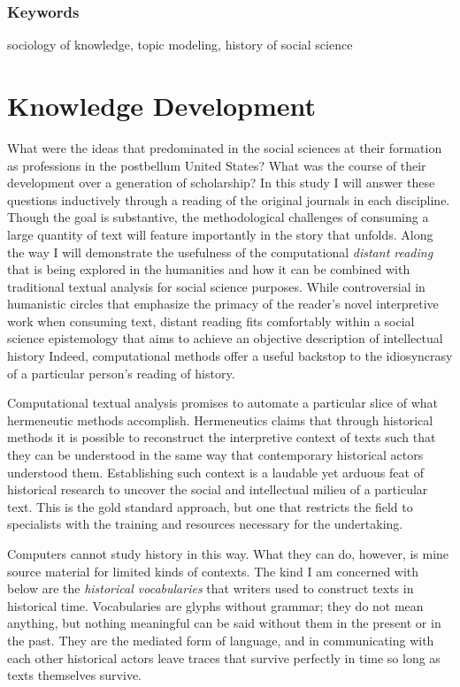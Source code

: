 \documentclass[]{book}
\theoremstyle{definition}
\theoremstyle{definition}
\theoremstyle{definition}
\theoremstyle{remark}
\begin{document}
\hypertarget{keywords-3}{%
\subsubsection*{Keywords}\label{keywords-3}}


sociology of knowledge, topic modeling, history of social
science

\hypertarget{kd}{%
\section{Knowledge Development}\label{kd}}

What were the ideas that predominated in the social sciences at their
formation as professions in the postbellum United States? What was the
course of their development over a generation of scholarship? In this
study I will answer these questions inductively through a reading of the
original journals in each discipline. Though the goal is substantive,
the methodological challenges of consuming a large quantity of text will
feature importantly in the story that unfolds. Along the way I will
demonstrate the usefulness of the computational \emph{distant reading}
that is being explored in the humanities and how it can be combined with
traditional textual analysis for social science purposes. While
controversial in humanistic circles that emphasize the primacy of the
reader's novel interpretive work when consuming text, distant reading
fits comfortably within a social science epistemology that aims to
achieve an objective description of intellectual history Indeed,
computational methods offer a useful backstop to the idiosyncrasy of a
particular person's reading of history.

Computational textual analysis promises to automate a particular slice
of what hermeneutic methods accomplish. Hermeneutics claims that through
historical methods it is possible to reconstruct the interpretive
context of texts such that they can be understood in the same way that
contemporary historical actors understood them. Establishing such
context is a laudable yet arduous feat of historical research to uncover
the social and intellectual milieu of a particular text. This is the
gold standard approach, but one that restricts the field to specialists
with the training and resources necessary for the undertaking.

Computers cannot study history in this way. What they can do, however,
is mine source material for limited kinds of contexts. The kind I am
concerned with below are the \emph{historical vocabularies} that writers
used to construct texts in historical time. Vocabularies are glyphs
without grammar; they do not mean anything, but nothing meaningful can
be said without them in the present or in the past. They are the
mediated form of language, and in communicating with each other
historical actors leave traces that survive perfectly in time so long as
texts themselves survive.
\end{document}
